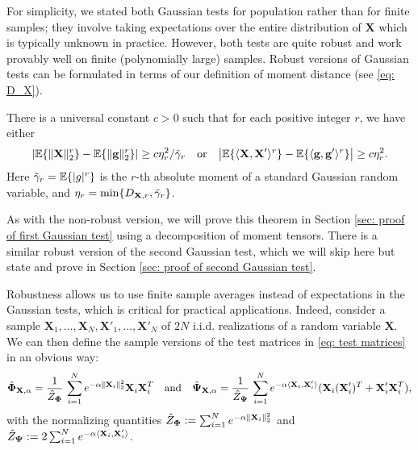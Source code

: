 \documentclass[final,12pt]{colt2018} %
\numberwithin{equation}{section}
\DeclarePairedDelimiter{\abs}{\lvert}{\rvert}
\DeclarePairedDelimiter{\norm}{\lVert}{\rVert}
\DeclarePairedDelimiter{\braces}{\lbrace}{\rbrace}
\DeclarePairedDelimiter{\inprod}{\langle}{\rangle}
\newcommand{\E}{\mathbb{E}}
\newcommand{\boldg}{\textbf{g}}
\newcommand{\boldPhi}{\boldsymbol{\Phi}}
\newcommand{\boldPsi}{\boldsymbol{\Psi}}
\newcommand{\boldX}{\textbf{X}}
\begin{document}
For simplicity, we stated both Gaussian tests for population rather than for finite samples;
they involve taking expectations over the entire distribution of $\boldX$ which is typically unknown in practice.
However, both tests are quite robust and work provably well on finite (polynomially large) samples. 
Robust versions of Gaussian tests can be formulated in terms of our definition of moment distance (see \eqref{eq: D_X}).

\begin{theorem} \label{thm: first Gaussian test, robust}
  There is a universal constant $c>0$ such that for each positive integer $r$, 
  we have either
  $$
  \abs*{\E\braces{\norm{\boldX}_2^r}-\E\braces{\norm{\boldg}_2^r}} \geq c \eta_r^2 /\tilde{\gamma}_r
  \quad \text{or} \quad
  \abs*{\E\braces{\inprod{\boldX,\boldX'}^r} - \E\braces{\inprod{\boldg,\boldg'}^r}} \geq c \eta_r^2.
  $$
  Here $\tilde{\gamma}_r = \E\braces{|g|^r}$ is the $r$-th absolute moment of a standard Gaussian random variable, and $\eta_r = \min\braces{D_{\boldX,r}, \tilde{\gamma}_r}$.  
\end{theorem}

As with the non-robust version, we will prove this theorem in Section \ref{sec: proof of first Gaussian test} using a decomposition of moment tensors.
There is a similar robust version of the second Gaussian test, which we will skip here
but state and prove in Section \ref{sec: proof of second Gaussian test}.

Robustness allows us to use finite sample averages instead
of expectations in the Gaussian tests, which is critical for practical applications. 
Indeed, consider a sample $\boldX_1,\ldots,\boldX_N, \boldX'_1,\ldots,\boldX'_N$ 
of $2N$ i.i.d. realizations of a random variable $\boldX$.
We can then define the sample versions of the test matrices in \eqref{eq: test matrices} 
in an obvious way:
\begin{equation}
	\hat{\boldPhi}_{\boldX,\alpha} = \frac{1}{\hat{Z}_{\boldPhi}} \, \sum_{i=1}^N e^{-\alpha\norm{\boldX_i}_2^2} \boldX_i \boldX_i^T 
	\quad \text{and} \quad
	\hat{\boldPsi}_{\boldX,\alpha} = \frac{1}{\hat{Z}_{\boldPsi}} \, \sum_{i=1}^N e^{-\alpha \inprod{\boldX_i,\boldX'_i}} (\boldX_i (\boldX'_i)^T + \boldX_i'\boldX_i^T),
\end{equation}
with the normalizing quantities $\hat{Z}_{\boldPhi} := \sum_{i=1}^N e^{-\alpha\norm{\boldX_i}_2^2}$
and $\hat{Z}_{\boldPsi} := 2\sum_{i=1}^N e^{-\alpha \inprod{\boldX_i,\boldX'_i}}$.
\end{document}
